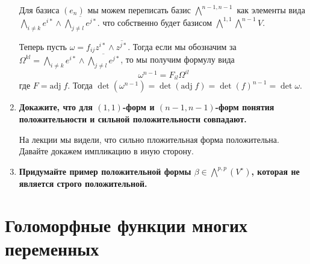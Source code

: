 \documentclass{article}
\begin{document}
\begin{enumerate}
        Для базиса $(e_n)$ мы можем переписать базис $\bigwedge^{n-1,n-1}$
        как элементы вида $\bigwedge_{i\neq k} e^{i*}\wedge\overline{\bigwedge_{j\neq l}e^{j*}}$.
        что собственно будет базисом $\bigwedge^{1,1}\bigwedge^{n−1}V$.

        Теперь пусть $\omega = f_{ij} z^{i*}\wedge\overline{z^{j*}}$. Тогда если
        мы обозначим за $\Omega^{kl}=\bigwedge_{i\neq k} e^{i*}\wedge\overline
        {\bigwedge_{j\neq l}e^{j*}}$, то мы получим формулу вида
        \[\omega^{n-1}=F_{il}\Omega^{il}\]
        где $F=\text{adj}\;f$. Тогда $\det(\omega^{n-1})=\det(\text{adj}\;f)=\det(f)^{n-1}
        =\det\omega$.

    \item \textbf{Докажите, что для $(1,1)$-форм и $(n−1,n−1)$-форм понятия
        положительности и сильной положительности совпадают.}

        На лекции мы видели, что сильно пложительная форма положительна. Давайте
        докажем импликацию в иную сторону.

    \item \textbf{Придумайте пример положительной формы $β\in\bigwedge^{p,p}(V^∗)$,
        которая не является строго положительной.}
\end{enumerate}

    \section{Голоморфные функции многих переменных}
\end{document}
